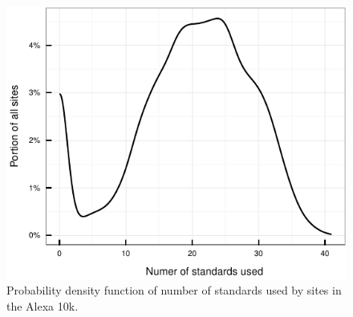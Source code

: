 \begin{figure}[ht]
  \centering
  \includegraphics[width=.5\textwidth]{figures/site_complexity.pdf}
  \caption{Probability density function of number of standards used by sites in the Alexa 10k.}
  \label{fig:results-site-complexity}
\end{figure}